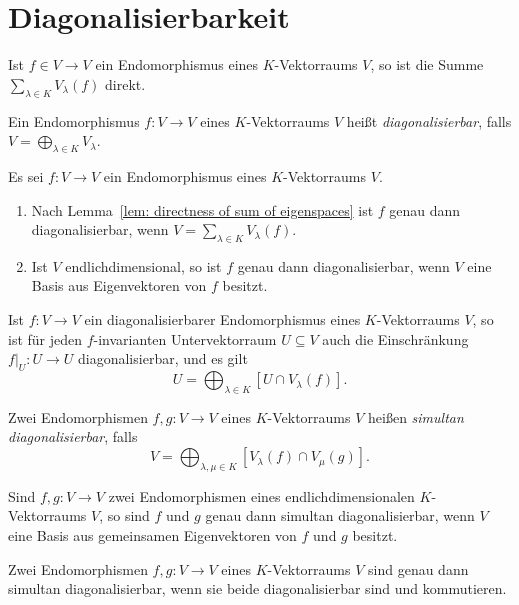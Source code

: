 \section{Diagonalisierbarkeit}


\begin{lemma}\label{lem: directness of sum of eigenspaces}
  Ist $f \in V \to V$ ein Endomorphismus eines $K$-Vektorraums $V$, so ist die Summe $\sum_{\lambda \in K} V_\lambda(f)$ direkt.
\end{lemma}


\begin{definition}
  Ein Endomorphismus $f \colon V \to V$ eines $K$-Vektorraums $V$ heißt \emph{diagonalisierbar}, falls $V = \bigoplus_{\lambda \in K} V_\lambda$.
\end{definition}


\begin{remark}
  Es sei $f \colon V \to V$ ein Endomorphismus eines $K$-Vektorraums $V$.
  \begin{enumerate}[leftmargin=*, label=\roman*)]
    \item
      Nach Lemma~\ref{lem: directness of sum of eigenspaces} ist $f$ genau dann diagonalisierbar, wenn $V = \sum_{\lambda \in K} V_\lambda(f)$.
    \item
      Ist $V$ endlichdimensional, so ist $f$ genau dann diagonalisierbar, wenn $V$ eine Basis aus Eigenvektoren von $f$ besitzt.
  \end{enumerate}
\end{remark}


\begin{proposition}
  Ist $f \colon V \to V$ ein diagonalisierbarer Endomorphismus eines $K$-Vek\-tor\-raums $V$, so ist für jeden $f$-invarianten Untervektorraum $U \subseteq V$ auch die Einschränkung $f|_U \colon U \to U$ diagonalisierbar, und es gilt
  \[
    U = \bigoplus_{\lambda \in K} [ U \cap V_\lambda(f) ].
  \]
\end{proposition}


\begin{definition}
  Zwei Endomorphismen $f, g \colon V \to V$ eines $K$-Vektorraums $V$ heißen \emph{simultan diagonalisierbar}, falls
  \[
    V = \bigoplus_{\lambda, \mu \in K} [V_\lambda(f) \cap V_\mu(g)].
  \]
\end{definition}


\begin{remark}
  Sind $f, g \colon V \to V$ zwei Endomorphismen eines endlichdimensionalen $K$-Vektorraums $V$, so sind $f$ und $g$ genau dann simultan diagonalisierbar, wenn $V$ eine Basis aus gemeinsamen Eigenvektoren von $f$ und $g$ besitzt.
\end{remark}


\begin{proposition}
  Zwei Endomorphismen $f, g \colon V \to V$ eines $K$-Vektorraums $V$ sind genau dann simultan diagonalisierbar, wenn sie beide diagonalisierbar sind und kommutieren.
\end{proposition}






